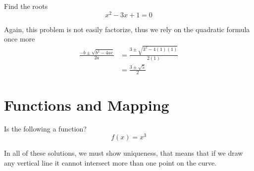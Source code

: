 \documentclass[a4paper]{article}
\begin{document}
\begin{question}{}{}
Find the roots
\[
x^2 - 3x + 1 = 0
\]
\end{question}
Again, this problem is not easily factorize, thus we rely on the quadratic formula once more
\begin{align*}
\frac{-b \pm \sqrt{b^2 - 4ac}}{2a} &= \frac{3 \pm \sqrt{3^2 - 4(1)(1)}}{2(1)} \\
    &= \frac{3 \pm \sqrt{5}}{2}
\end{align*}
\begin{center}
\end{center}


\section{Functions and Mapping}

\begin{question}{}{} Is the following a function?
\[
f(x) = x^3
\]
\end{question}
In all of these solutions, we must show uniqueness, that means that if we draw any vertical line it cannot intersect more than one point on the curve. \\
\begin{center}
\end{center}
\end{document}
